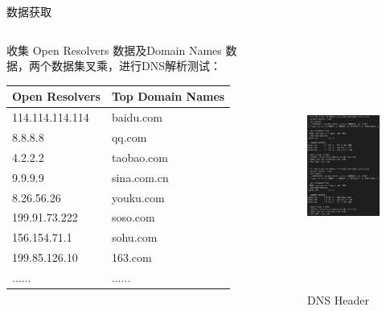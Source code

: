 \documentclass{beamer}
\begin{document}
\begin{frame}{数据获取}
  \begin{columns}
    \begin{column}{0.5\textwidth}
      \scriptsize{收集 Open Resolvers 数据及Domain Names 数据，两个数据集叉乘，进行DNS解析测试：}
      
      \begin{table}
        \scriptsize
      \begin{tabular}{l|l}
        \toprule
        Open Resolvers& Top Domain Names\\
        \midrule
        114.114.114.114 & baidu.com \\
        8.8.8.8 & qq.com \\
        4.2.2.2&     taobao.com \\
        9.9.9.9&  sina.com.cn \\
        
        8.26.56.26& youku.com \\
        
        199.91.73.222& soso.com \\
        
        156.154.71.1& sohu.com \\
        
        199.85.126.10& 163.com \\
        ......&...... \\
        \bottomrule
        \end{tabular}
      \end{table}
    \end{column}
    \begin{column}{0.5\textwidth}
    
      \begin{figure}
        \includegraphics[height=8.09cm,width=5.83cm]{images/digres.png}
        \caption{DNS Header}
        \end{figure}
    \end{column}
    \end{columns}
  
\end{frame}
\end{document}
